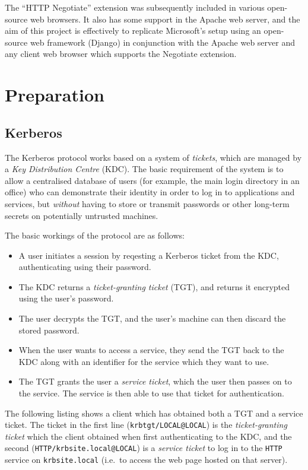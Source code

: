 \documentclass{article}
\begin{document}
The ``HTTP Negotiate'' extension was subsequently included in various open-source web browsers. It also has some support in the Apache web server, and the aim of this project is effectively to replicate Microsoft's setup using an open-source web framework (Django) in conjunction with the Apache web server and any client web browser which supports the Negotiate extension.

\section{Preparation}

\subsection{Kerberos}
The Kerberos protocol works based on a system of \textit{tickets}, which are managed by a \textit{Key Distribution Centre} (KDC). The basic requirement of the system is to allow a centralised database of users (for example, the main login directory in an office) who can demonstrate their identity in order to log in to applications and services, but \textit{without} having to store or transmit passwords or other long-term secrets on potentially untrusted machines.

The basic workings of the protocol are as follows:

\begin{itemize}
\item
  A user initiates a session by reqesting a Kerberos ticket from the KDC, authenticating using their password.
\item
  The KDC returns a \textit{ticket-granting ticket} (TGT), and returns it encrypted using the user's password.
\item
  The user decrypts the TGT, and the user's machine can then discard the stored password.
\item
  When the user wants to access a service, they send the TGT back to the KDC along with an identifier for the service which they want to use.
\item
  The TGT grants the user a \textit{service ticket}, which the user then passes on to the service. The service is then able to use that ticket for authentication.
\end{itemize}

The following listing shows a client which has obtained both a TGT and a service ticket. The ticket in the first line (\verb+krbtgt/LOCAL@LOCAL+) is the \textit{ticket-granting ticket} which the client obtained when first authenticating to the KDC, and the second (\verb+HTTP/krbsite.local@LOCAL+) is a \textit{service ticket} to log in to the \verb+HTTP+ service on \verb+krbsite.local+ (i.e.\ to access the web page hosted on that server).
\end{document}

